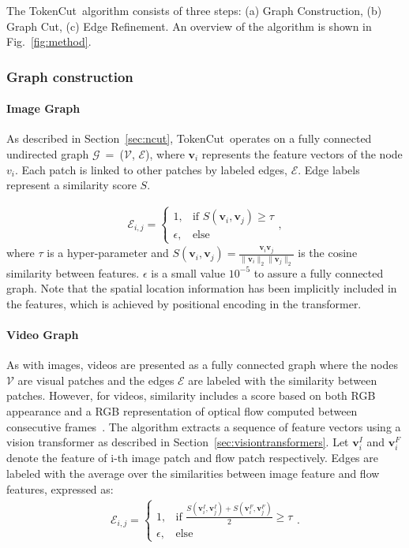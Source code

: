 \documentclass[twocolumn]{article}
\newcommand{\name} {TokenCut}
\newcommand{\feat}{\mathbf{v}}
\newcommand{\graph}{\mathcal{G}}
\newcommand{\node}{\mathcal{V}}
\newcommand{\edge}{\mathcal{E}}
\newcommand{\simi}{S}
\newcommand{\minsimi}{\tau}
\begin{document}
The \name~algorithm consists of three steps: (a) Graph Construction, (b) Graph Cut, (c) Edge Refinement. An overview of the algorithm is shown in Fig.~\ref{fig:method}. 

\subsubsection{Graph construction}
\paragraph*{Image Graph}
\label{sec:image_graph}
As described in Section~\ref{sec:ncut},  \name~operates on a fully connected undirected graph $\graph$~=~($\node$, $\edge$), where $\feat_i$ represents the feature vectors of the node $v_i$. Each patch is linked to other patches by labeled edges,  $\edge$. Edge labels represent a similarity score $\simi$. 


\begin{align}
	\label{eqn:edge}
	\edge_{i,j} =
	\begin{cases} 
		1,  & \mbox{if }\simi(\feat_i, \feat_j) \ge \minsimi \\
		\epsilon, & \mbox{else}
	\end{cases},
\end{align}
where $\minsimi$ is a hyper-parameter and $\simi(\feat_i, \feat_j) = \frac{\feat_i \feat_j}{\lVert \feat_i \rVert_2 \lVert \feat_j \rVert_2}$ is the cosine similarity between features. $\epsilon$ is a small value 
$10^{-5}$ to assure a fully connected graph.
Note that the spatial location information has been implicitly included in the features, which is achieved by positional encoding in the transformer. 

\paragraph*{Video Graph} As with images, videos are presented as a fully connected graph where the nodes $\node$ are  visual patches and the edges $\edge$ are labeled with the similarity between patches. However, for videos, similarity includes a score based on both RGB appearance and a RGB representation of optical flow computed between consecutive frames~\cite{baker2011database}. 
The algorithm extracts a sequence of feature vectors using a vision transformer as described in Section~\ref{sec:visiontransformers}. 
Let $\feat^I_i$  and $\feat^F_i$ denote  the feature of i-th image patch and flow patch respectively. Edges are labeled with  the average 
over the similarities between image feature and flow features, expressed as:
\begin{align}
	\label{eqn:edge2}
	\edge_{i,j} =
	\begin{cases} 
		1,  & \mbox{if } \frac{\simi(\feat^I_i, \feat^I_j)+\simi(\feat^F_i, \feat^F_j)}{2}\ge \minsimi \\
		\epsilon, & \mbox{else}
	\end{cases}.
\end{align}
\end{document}
